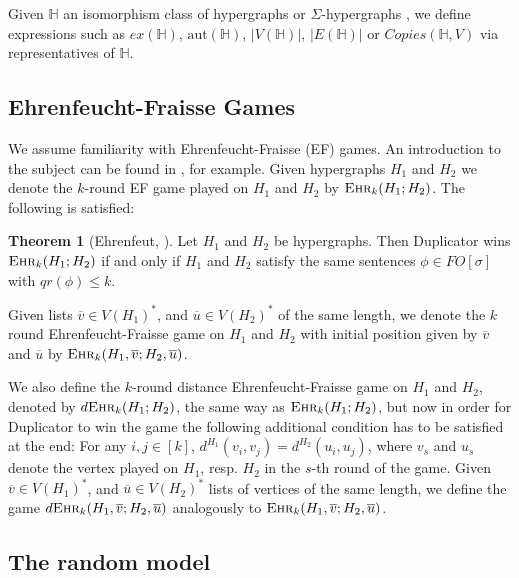 \documentclass[12pt,notitlepage,a4paper]{article}
\theoremstyle{definition}
\newtheorem{theorem}{Theorem}[section]
\newcommand{\ehr}{\textsc{Ehr}}
\newcommand{\aut}{\mathrm{aut}}
\begin{document}
Given $\mathbb{H}$ an isomorphism class of hypergraphs or $\Sigma$-hypergraphs
, we define expressions
such as $ex(\mathbb{H})$, $\aut(\mathbb{H})$,
$|V(\mathbb{H})|$, $|E(\mathbb{H})|$ or
$Copies(\mathbb{H},V)$ via representatives of $\mathbb{H}$.\par 




\subsection{Ehrenfeucht-Fraisse Games}

We assume familiarity with Ehrenfeucht-Fraisse (EF) games.
An introduction to the subject can be found in
\cite[Section 2]{finitemodeltheory1}, for example. Given
hypergraphs $H_1$ and $H_2$ we denote the $k$-round EF game played 
on $H_1$ and
$H_2$ by $\ehr_k(H_1;H_2)$.
The following is satisfied:

\begin{theorem}
	[Ehrenfeut, \citealp{ehrenfeucht1961application}] Let
	$H_1$ and $H_2$ be hypergraphs.
	Then Duplicator wins $\ehr_k(H_1;H_2)$
	if and only if $H_1$ and $H_2$ satisfy the same 
	sentences $\phi\in FO[\sigma]$ with $qr(\phi)\leq k$.		
\end{theorem}

Given lists $\overline{v}\in V(H_1)^*$, and 
$\overline{u}\in V(H_2)^*$ of the same length, 
we denote the $k$ round 
Ehrenfeucht-Fraisse game on $H_1$ and $H_2$ with initial position given
by $\overline{v}$ and $\overline{u}$ by $\ehr_k(H_1,\overline{v};H_2,\overline{u})$.\par

We also define the $k$-round distance Ehrenfeucht-Fraisse game on 
$H_1$ and $H_2$, denoted by $d\ehr_k(H_1;H_2)$, the same way as
$\ehr_k(H_1;H_2)$, but now in order for Duplicator to win the
game the following additional condition has to be satisfied 
at the end: For any $i,j\in [k]$, $d^{H_1}(v_i,v_j)=d^{H_2}(u_i,u_j)$,
where $v_s$ and $u_s$ denote the vertex played on $H_1$, resp. $H_2$ in the 
$s$-th round of the game. 
Given $\overline{v}\in V(H_1)^*$, and $\overline{u}\in V(H_2)^*$
lists of vertices of the same length,
we define the game 
$d\ehr_k(H_1,\overline{v};H_2,\overline{u})$ analogously to 
$\ehr_k(H_1,\overline{v};H_2,\overline{u})$.


\subsection{The random model} \label{sect:random}
\end{document}
